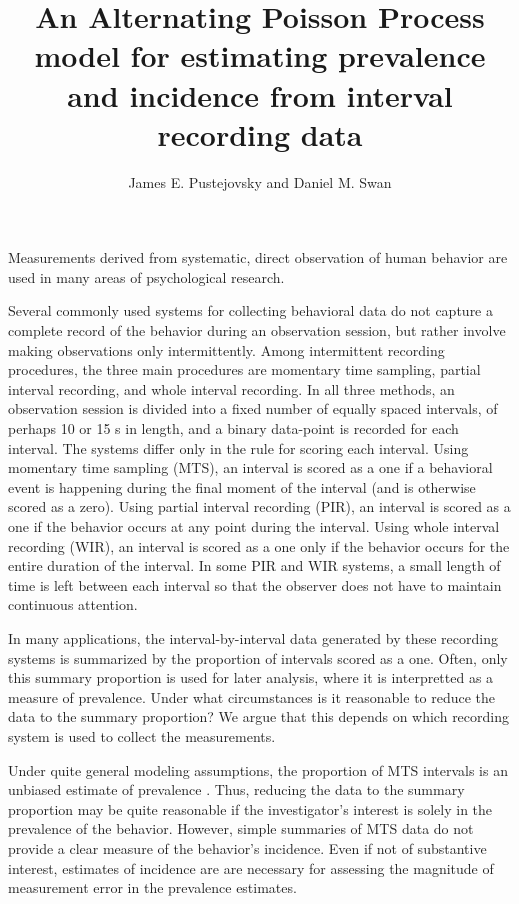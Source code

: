 \documentclass[man, noextraspace, floatsintext]{apa6}\usepackage[]{graphicx}\usepackage[]{color}
\title{An Alternating Poisson Process model for estimating prevalence and incidence from interval recording data}
\author{James E. Pustejovsky and Daniel M. Swan}
\affiliation{The University of Texas at Austin}
\begin{document}
\maketitle

Measurements derived from systematic, direct observation of human behavior are used in many areas of psychological research.


Several commonly used systems for collecting behavioral data do not capture a complete record of the behavior during an observation session, but rather involve making observations only intermittently. Among intermittent recording procedures, the three main procedures are momentary time sampling, partial interval recording, and whole interval recording. In all three methods, an observation session is divided into a fixed number of equally spaced intervals, of perhaps 10 or 15 s in length, and a binary data-point is recorded for each interval. The systems differ only in the rule for scoring each interval. Using momentary time sampling (MTS), an interval is scored as a one if a behavioral event is happening during the final moment of the interval (and is otherwise scored as a zero). Using partial interval recording (PIR), an interval is scored as a one if the behavior occurs at any point during the interval. Using whole interval recording (WIR), an interval is scored as a one only if the behavior occurs for the entire duration of the interval. In some PIR and WIR systems, a small length of time is left between each interval so that the observer does not have to maintain continuous attention. 

In many applications, the interval-by-interval data generated by these recording systems is summarized by the proportion of intervals scored as a one. Often, only this summary proportion is used for later analysis, where it is interpretted as a measure of prevalence. Under what circumstances is it reasonable to reduce the data to the summary proportion? We argue that this depends on which recording system is used to collect the measurements. 

Under quite general modeling assumptions, the proportion of MTS intervals is an unbiased estimate of prevalence \citep{Rogosa1991statistical}. Thus, reducing the data to the summary proportion may be quite reasonable if the investigator's interest is solely in the prevalence of the behavior. However, simple summaries of MTS data do not provide a clear measure of the behavior's incidence. Even if not of substantive interest, estimates of incidence are  are necessary for assessing the magnitude of measurement error in the prevalence estimates. 
\end{document}
